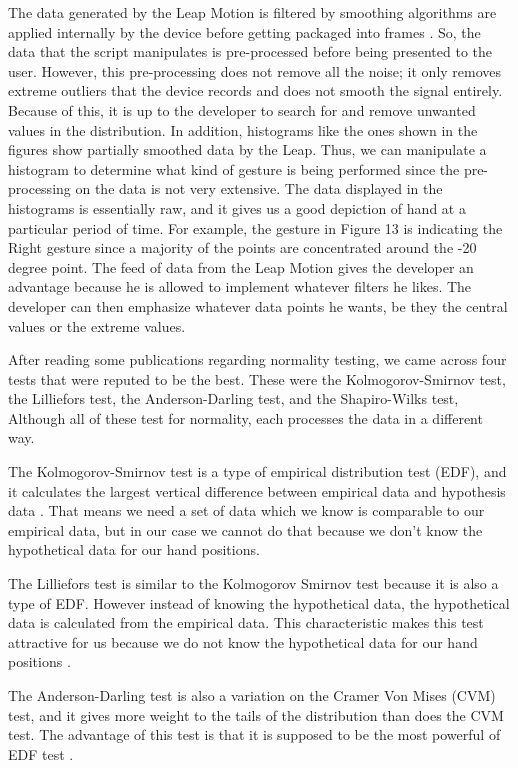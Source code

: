 \documentclass[letterpaper,english, 12pt]{article}
\begin{document}
The data generated by the Leap Motion is filtered by smoothing algorithms are applied internally by the device before getting packaged into frames \cite{cit11}. So, the data that the script manipulates is pre-processed before being presented to the user. However, this pre-processing does not remove all the noise; it only removes extreme outliers that the device records and does not smooth the signal entirely. Because of this, it is up to the developer to search for and remove unwanted values in the distribution. In addition, histograms like the ones shown in the figures show partially smoothed data by the Leap. Thus, we can manipulate a histogram to determine what kind of gesture is being performed since the pre-processing on the data is not very extensive. The data displayed in the histograms is essentially raw, and it gives us a good depiction of hand at a particular period of time. For example, the gesture in Figure 13 is indicating the Right gesture since a majority of the points are concentrated around the -20 degree point. The feed of data from the Leap Motion gives the developer an advantage because he is allowed to implement whatever filters he likes. The developer can then emphasize whatever data points he wants, be they the central values or the extreme values.

After reading some publications regarding normality testing, we came across four tests that were reputed to be the best. These were the Kolmogorov-Smirnov test, the Lilliefors test, the Anderson-Darling test, and the Shapiro-Wilks test, Although all of these test for normality, each processes the data in a different way.

The Kolmogorov-Smirnov test is a type of empirical distribution test (EDF), and it calculates the largest vertical difference between empirical data and hypothesis data \cite{cit8}. That means we need a set of data which we know is comparable to our empirical data, but in our case we cannot do that because we don't know the hypothetical data for our hand positions. 

The Lilliefors test is similar to the Kolmogorov Smirnov test because it is also a type of EDF. However instead of knowing the hypothetical data, the hypothetical data is calculated from the empirical data. This characteristic makes this test attractive for us because we do not know the hypothetical data for our hand positions \cite{cit7}.

The Anderson-Darling test is also a variation on the Cramer Von Mises (CVM) test, and it gives more weight to the tails of the distribution than does the CVM test. The advantage of this test is that it is supposed to be the most powerful of EDF test \cite{cit10}.
\end{document}
